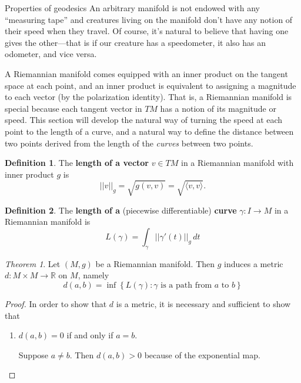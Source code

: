 \documentclass{article}
\newcommand{\fn}[3]{#1 \colon #2 \rightarrow #3}
\newcommand{\set}[1]{\left\{#1\right\}}
\theoremstyle{definition}
\newtheorem{definition}{Definition}[section]
\theoremstyle{remark}
\newtheorem{theorem}{Theorem}[section]
\begin{document}
\begin{section}{Properties of geodesics}
  An arbitrary manifold is not endowed with any ``measuring tape'' and creatures
  living on the manifold don't have any notion of their speed when they travel.
  Of course, it's natural to believe that having one gives the other---that is
  if our creature has a speedometer, it also has an odometer, and vice versa.

  A Riemannian manifold comes equipped with an inner product on the tangent
  space at each point, and an inner product is equivalent to assigning a
  magnitude to each vector (by the polarization identity).
  That is, a Riemannian manifold is special because
  each tangent vector in $TM$ has a notion of its magnitude or speed.
  This section will develop the natural way of turning the speed at each point
  to the length of a curve, and a natural way to define the distance between two
  points derived from the length of the \textit{curves} between two points.


  \begin{definition}
    The \textbf{length of a vector} $v \in TM$ in a Riemannian manifold with
    inner product $g$ is \[
      ||v||_g = \sqrt{g(v, v)} = \sqrt{\langle v, v \rangle}.
    \]
  \end{definition}

  \begin{definition}
    The \textbf{length of a} (piecewise differentiable) \textbf{curve}
    $\fn \gamma I M$ in a Riemannian manifold is
    \[
      L(\gamma) = \int_\gamma ||\gamma'(t)||_g \, dt
    \]
  \end{definition}

  \begin{theorem}
    Let $(M, g)$ be a Riemannian manifold. Then $g$ induces a metric $\fn d {M \times M} {\mathbb R}$ on $M$,
    namely \[
      d(a, b) = \inf \set{L(\gamma) : \gamma \text{ is a path from } a \text{ to } b}
    \]
  \end{theorem}
  \begin{proof}
    In order to show that $d$ is a metric, it is necessary and sufficient to
    show that  \begin{enumerate}
      \item $d(a, b) = 0$  if and only if $a = b$.

      Suppose $a \neq b$. Then $d(a, b) > 0$  because of the exponential map.


\end{enumerate}
\end{proof}
\end{section}
\end{document}
